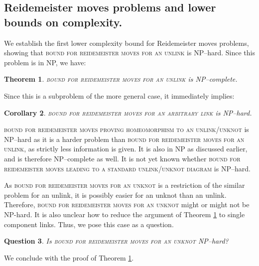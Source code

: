 \documentclass[12pt]{amsart}
\newtheorem{thm}{Theorem}
\newtheorem{corr}[thm]{Corollary}
\newtheorem{question}[thm]{Question}
\theoremstyle{definition}
\theoremstyle{remark}
\begin{document}
\subsection{Reidemeister moves problems and lower bounds on complexity.}

We establish the first lower complexity bound for Reidemeister moves problems, showing that \textsc{bound for reidemeister moves for an unlink} is NP--hard. Since this problem is in NP, we have:

\begin{thm}
\textsc{bound for reidemeister moves for an unlink} is NP--complete.
\label{thm_reid}
\end{thm}

Since this is a subproblem of the more general case, it immediately implies:
\begin{corr}
\textsc{bound for reidemeister moves for an arbitrary link} is NP--hard.
\end{corr}


\textsc{bound for reidemeister moves proving homeomorphism to an unlink/unknot} is NP--hard as it is a harder problem than \textsc{bound for reidemeister moves for an unlink}, as strictly less information is given.  It is also in NP as discussed earlier, and is therefore NP--complete as well.  It is not yet known whether \textsc{bound for reidemeister moves leading to a standard unlink/unknot diagram} is NP--hard.

As \textsc{bound for reidemeister moves for an unknot} is a restriction of the similar problem for an unlink, it is possibly easier for an unknot than an unlink. Therefore, \textsc{bound for reidemeister moves for an unknot} might or might not be NP-hard. It is also unclear how to reduce the argument of Theorem \ref{thm_reid} to single component links.  Thus, we pose this case as a question.

\begin{question}
Is \textsc{bound for reidemeister moves for an unknot} NP--hard?
\end{question}

We conclude with the proof of Theorem \ref{thm_reid}.
\end{document}
